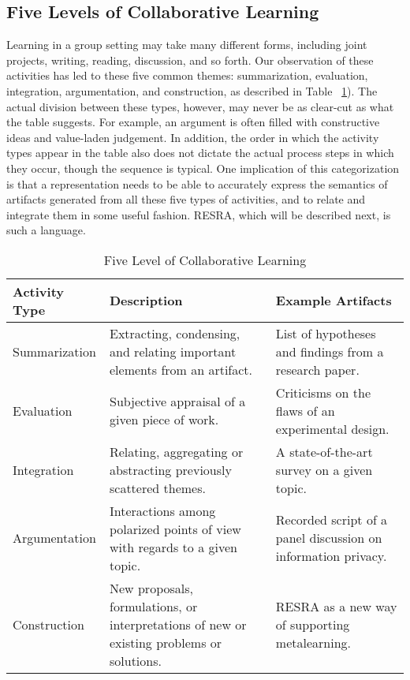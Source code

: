 \subsection{Five Levels of Collaborative Learning}
\label{sec:activity}

Learning in a group setting may take many different forms, including joint
projects, writing, reading, discussion, and so forth. Our observation of
these activities has led to these five common themes: summarization,
evaluation, integration, argumentation, and construction, as described in
Table ~\ref{tab:act}). The actual division between these types, however,
may never be as clear-cut as what the table suggests. For example, an
argument is often filled with constructive ideas and value-laden judgement.
In addition, the order in which the activity types appear in the table also
does not dictate the actual process steps in which they occur, though the
sequence is typical. One implication of this categorization is that a
representation needs to be able to accurately express the semantics of
artifacts generated from all these five types of activities, and to relate
and integrate them in some useful fashion. RESRA, which will be described
next, is such a language.

\begin{table}[ht]
  \begin{center}
    \begin{tabular} {|l|p{2.25in}|p{2.25in}|} \hline   
      
      {\bf Activity Type} & {\bf Description} & {\bf Example Artifacts} \\
\hline
      
      Summarization & Extracting, condensing, and relating important
elements from an artifact. & List of hypotheses and findings from a
research paper. \\ \hline
      
      Evaluation & Subjective appraisal of a given piece of work. &
Criticisms on the flaws of an experimental design. \\ \hline
      
      Integration & Relating, aggregating or abstracting previously
scattered themes. & A state-of-the-art survey on a given topic.
      \\ \hline
      
      Argumentation & Interactions among polarized points of view with
regards to a given topic. & Recorded script of a panel discussion
on information privacy. \\ \hline
      
      Construction & New proposals, formulations, or interpretations of new
or existing problems or solutions. & RESRA as a new way of supporting
metalearning. \\ \hline
    \end{tabular}
    \caption{Five Level of Collaborative Learning}
    \label{tab:act}
  \end{center}
\end{table}


